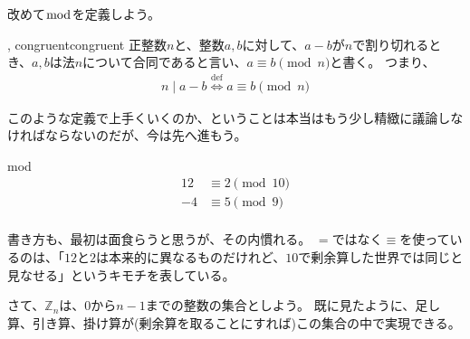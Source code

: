 改めて$\bmod$を定義しよう。

\begin{Defi}{, congruent}{congruent}
正整数$n$と、整数$a,b$に対して、$a-b$が$n$で割り切れるとき、$a,b$は法$n$について合同であると言い、$a\equiv b\pmod{n}$と書く。
つまり、
\begin{align*}
n \mid a-b \overset{\mbox{def}}{\iff} a \equiv b \pmod{n}
\end{align*}
\end{Defi}

このような定義で上手くいくのか、ということは本当はもう少し精緻に議論しなければならないのだが、今は先へ進もう。

\begin{Exam}{}{mod}
\begin{align*}
12 &\equiv 2 \pmod{10}\\
-4 &\equiv 5 \pmod{9}\\
\end{align*}
\end{Exam}

書き方も、最初は面食らうと思うが、その内慣れる。
$=$ではなく$\equiv$を使っているのは、「$12$と$2$は本来的に異なるものだけれど、$10$で剰余算した世界では同じと見なせる」というキモチを表している。

さて、$\mathbb{Z}_n$は、$0$から$n-1$までの整数の集合としよう。
既に見たように、足し算、引き算、掛け算が(剰余算を取ることにすれば)この集合の中で実現できる。

